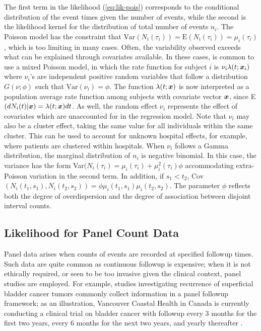 \documentclass[12pt]{article}
\def \bx{\mbox{\boldmath $x$ \unboldmath}\!\!}
\begin{document}
The first term in the likelihood (\ref{eq:lik-pois}) corresponds to the conditional distribution of the event times given the number of events, while the second is the likelihood kernel for the distribution of total number of events $n_i$. The Poisson model has the constraint that $\mbox{Var}(N_i(\tau_i))=\mbox{E}(N_i(\tau_i))=\mu_i(\tau_i)$, which is too limiting in many cases. Often, the variability observed exceeds what can be explained through covariates available. In these cases, is common to use a mixed Poisson model, in which the rate function for subject $i$ is $\nu_i \lambda(t;\bx_i)$ where $\nu_i$'s are independent positive random variables that follow a distribution $G(\nu;\phi)$ such that $\mbox{Var}(\nu_i)=\phi$. The function $\lambda(t;\bx)$ is now interpreted as a population average rate function among subjects with covariate vector $\bx$, since E$(dN_i(t)|\bx)=\lambda(t;\bx) dt$. As well, the random effect $\nu_i$ represents the effect of covariates which are unaccounted for in the regression model. Note that $\nu_i$ may also be a cluster effect, taking the same value for all individuals within the same cluster. This can be used to account for unknown hospital effects, for example, where patients are clustered within hospitals.  When $\nu_i$ follows a Gamma distribution, the marginal distribution of $n_i$ is negative binomial. In this case, the variance has the form Var$(N_i(\tau_i)=\mu_i(\tau_i)+\mu^2_i(\tau_i) \phi$ accommodating extra-Poisson variation in the second term. In addition, if $s_1<t_2$, Cov$(N_{i}(t_1,s_1),N_{i}(t_2,s_2))=\phi \mu_{i}(t_1,s_1) \mu_{i}(t_2,s_2)$. The parameter $\phi$ reflects both the degree of overdispersion and the degree of association between disjoint interval counts. 


\subsection{Likelihood for Panel Count Data}

Panel data arises when counts of events are recorded at specified followup times. Such data are quite common as continuous followup is expensive; when it is not ethically required, or seen to be too invasive given the clinical context, panel studies are employed. For example, studies investigating recurrence of superficial bladder cancer tumors commonly collect information in a panel followup framework; as an illustration, Vancouver Coastal Health in Canada is currently conducting a clinical trial on bladder cancer with followup every 3 months for the first two years, every 6 months for the next two years, and yearly thereafter \citep{bla-vch2012}. 
\end{document}
